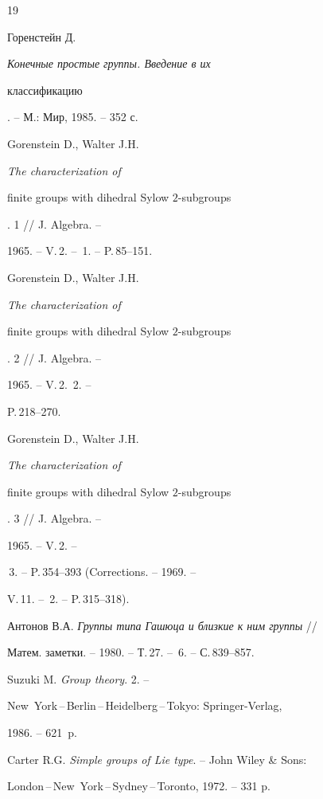 \begin{thebibliography}{19}


Горенстейн Д. {\em Конечные простые группы. Введение в их


классификацию}. --  М.: Мир, 1985. -- 352 с.







Gorenstein D., Walter J.H. {\em The characterization of


finite groups with dihedral Sylow $2$-subgroups}. 1 // J. Algebra. --


1965. -- V.\,2. -- \No\,1. -- P.\,85--151.







Gorenstein D., Walter J.H. {\em The characterization of


finite groups with dihedral Sylow $2$-subgroups}. 2 // J. Algebra. --


1965. -- V.\,2. \No\,2. --


P.\,218--270.







Gorenstein D., Walter J.H. {\em The characterization of


finite groups with dihedral Sylow $2$-subgroups}. 3 // J. Algebra. --


1965. -- V.\,2. --


\No\,3. -- P.\,354--393 (Corrections. -- 1969. --


V.\,11. -- \No\,2. -- P.\,315--318).







Антонов В.А. {\em Группы типа Гашюца и близкие к ним группы} //


Матем. заметки. -- 1980. -- Т.\,27. -- \No\,6. -- С.\,839--857.







Suzuki M. {\em Group theory}. 2. -- 


New~York\,--\,Berlin\,--\,Heidelberg\,--\,Tokyo: Springer-Verlag,


1986. -- 621~p.







Carter R.G. {\em Simple groups of Lie type}. -- John Wiley \& Sons:


London\,--\,New~York\,--\,Sydney\,--\,Toronto, 1972. -- 331 p.





\end{thebibliography}





